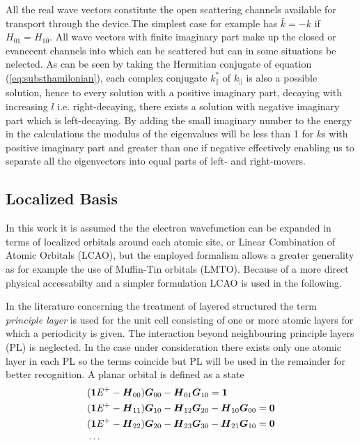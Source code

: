 All the real wave vectors constitute the open scattering channels available for transport through the device.The simplest case for example has $\bar{k}=-k$ if $H_{01}=H_{10}$.
All wave vectors with finite imaginary part make up the closed or evanecent channels into which can be scattered but can in some situations be nelected.
As can be seen by taking the Hermitian conjugate of equation (\ref{eq:substhamilonian}), each complex conjugate $k_{\|}^*$ of $k_{\|}$ is also a possible solution, 
hence to every solution with a positive imaginary part, decaying with increasing $l$ i.e. right-decaying, there exists a solution with negative imaginary part which is left-decaying.
By adding the small imaginary number to the energy in the calculations the modulus of the eigenvalues will be less than 1 for $k$s with positive imaginary part and greater than one if negative effectively enabling us to separate all the eigenvectors into equal parts of left- and right-movers\cite{JChemPhys.120.7733}.


\subsection{Localized Basis}

In this work it is assumed the the electron wavefunction can be expanded in terms of localized orbitals around each atomic site, or Linear Combination of Atomic Orbitals (LCAO), but the employed formalism allows a greater generality as for example the use of Muffin-Tin orbitals (LMTO). Because of a more direct physical accessabilty and a simpler formulation LCAO is used in the following.

In the literature concerning the treatment of layered structured the term \emph{principle layer} is used for the unit cell consisting of one or more atomic layers for which a periodicity is given.
The interaction beyond neighbouring principle layers (PL) is neglected. In the case under consideration there exists only one atomic layer in each PL so the terms coincide but PL will be used in the remainder for better recognition.
A planar orbital is defined as a state 
\begin{align}
	&(\boldsymbol{1}E^+-\boldsymbol{H}_{00})\boldsymbol{G}_{00}-\boldsymbol{H}_{01}\boldsymbol{G}_{10}=\boldsymbol{1}\nonumber \\
	&(\boldsymbol{1}E^+-\boldsymbol{H}_{11})\boldsymbol{G}_{10}-\boldsymbol{H}_{12}\boldsymbol{G}_{20}-\boldsymbol{H}_{10}\boldsymbol{G}_{00}=\boldsymbol{0}\\
	&(\boldsymbol{1}E^+-\boldsymbol{H}_{22})\boldsymbol{G}_{20}-\boldsymbol{H}_{23}\boldsymbol{G}_{30}-\boldsymbol{H}_{21}\boldsymbol{G}_{10}=\boldsymbol{0}\nonumber \\
	&\cdots\nonumber
	\label{eq:LRS}
\end{align}


